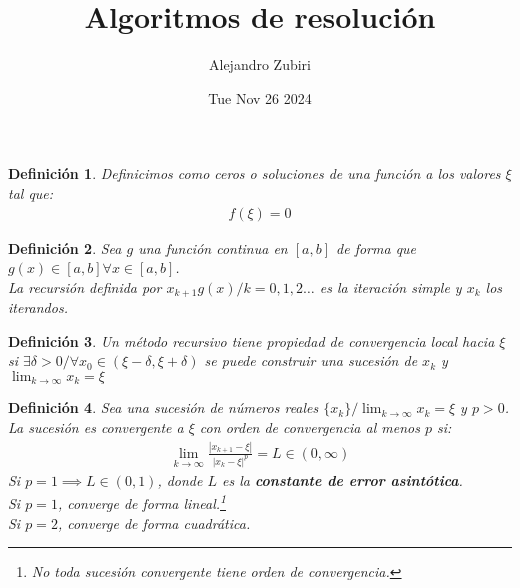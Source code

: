 \documentclass{article}
\author{Alejandro Zubiri}
\date{Tue Nov 26 2024}
\title{Algoritmos de resolución}
\newtheorem{defin}{Definición}
\begin{document}
\maketitle
\tableofcontents
\pagebreak
\begin{defin}
    Definicimos como ceros o soluciones de una función a los valores $\xi $ tal que:
    \begin{equation}
        \begin{split}
            f(\xi ) = 0
        \end{split}
    \end{equation}
\end{defin}
\begin{defin}
    Sea $g$ una función continua en $[a,b]$ de forma que $g(x) \in [a,b] \forall x \in [a,b]$.\\
    La recursión definida por $x_{k+1} g(x) / k=0,1,2\dots$ es la iteración simple y $x_{k}$
    los iterandos.
\end{defin}
\begin{defin}
    Un método recursivo tiene propiedad de convergencia local hacia $\xi $ si
    $\exists \delta >0 / \forall x_{0} \in (\xi -\delta , \xi +\delta )$ se puede
    construir una sucesión de $x_{k}$ y $\lim_{k \to \infty} x_{k} = \xi $
\end{defin}
\begin{defin}
    Sea una sucesión de números reales $\{ x_{k} \} / \lim_{k \to \infty}x_{k} = \xi $ y
    $p > 0$. La sucesión es convergente a $\xi $ con orden de convergencia al menos $p$ si:
    \begin{equation}
        \begin{split}
            \lim_{k \to \infty} \frac{|x_{k+1} - \xi |}{|x_{k}-\xi |^{p}} = L \in (0,\infty)
        \end{split}
    \end{equation}
    Si $p = 1 \implies L \in (0,1)$, donde $L$ es la \textbf{constante de error asintótica}.\\
    Si $p=1$, converge de forma lineal.\footnote{No toda sucesión convergente tiene orden de convergencia.}\\
    Si $p = 2$, converge de forma cuadrática.
\end{defin}
\end{document}
